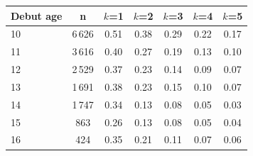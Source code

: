 \begin{tabular}{lcccccc}
\toprule
Debut age & n & $k$=1 & $k$=2 & $k$=3 & $k$=4 & $k$=5 \\
\midrule
10 & 6\,626 & 0.51 & 0.38 & 0.29 & 0.22 & 0.17 \\
11 & 3\,616 & 0.40 & 0.27 & 0.19 & 0.13 & 0.10 \\
12 & 2\,529 & 0.37 & 0.23 & 0.14 & 0.09 & 0.07 \\
13 & 1\,691 & 0.38 & 0.23 & 0.15 & 0.10 & 0.07 \\
14 & 1\,747 & 0.34 & 0.13 & 0.08 & 0.05 & 0.03 \\
15 & 863 & 0.26 & 0.13 & 0.08 & 0.05 & 0.04 \\
16 & 424 & 0.35 & 0.21 & 0.11 & 0.07 & 0.06 \\
\bottomrule
\end{tabular}
